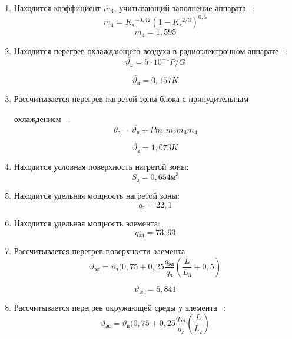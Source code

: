 \begin{enumerate}[label={\arabic*.}]
\item Находится коэффициент $m_4$,
   учитывающий заполнение аппарата ~\cite{Rotkop1976}:
   \begin{equation}
     m_4 = K\mathrm{_{з}}^{-0,42}(1-K\mathrm{_{з}}^{2/3})^{0,5}
   \end{equation}
   $$m_4 = 1,595$$
  
\item Находится перегрев охлаждающего воздуха
  в радиоэлектронном аппарате ~\cite{Rotkop1976}:
  \begin{equation}
    \overline{\vartheta\mathrm{_{в}}} = 5 \cdot 10^{-4} P/G
  \end{equation}
  
  $$\overline{\vartheta\mathrm{_{в}}} = 0,157K$$

\item Рассчитывается перегрев нагретой зоны блока с принудительным

  охлаждением ~\cite{Rotkop1976}:
  \begin{equation}
    \vartheta\mathrm{_{з}} = \overline{\vartheta\mathrm{_{в}}} + P m_1 m_2 m_3 m_4
    \end{equation}
  

    $$\overline{\vartheta\mathrm{_{з}}} = 1,073 K$$

\item Находится условная поверхность нагретой зоны:
  $$S\mathrm{_{з}} = 0,654 \mathrm{м^3}$$

\item Находится удельная мощность нагретой зоны:
  $$q\mathrm{_{з}} = 22,1$$

\item Находится удельная мощность элемента:
  $$q\mathrm{_{эл}} = 73,93$$

\item Рассчитывается перегрев поверхности элемента ~\cite{Rotkop1976}
    \begin{equation}
    \vartheta\mathrm{_{эл}}   =  \vartheta\mathrm{_{з}} (0,75 + 0,25\frac{q\mathrm{_{эл}}}{q\mathrm{_{з}}} (\frac{L}{L_{3}} + 0,5)
    \end{equation}

    $$\vartheta\mathrm{_{эл}} = 5,841$$

\item Рассчитывается перегрев окружающей
  среды у элемента ~\cite{Rotkop1976}:
  \begin{equation}
    \vartheta\mathrm{_{эс}}   =  \vartheta\mathrm{_{в}} (0,75 + 0,25\frac{q\mathrm{_{эл}}}{q\mathrm{_{з}}} (\frac{L}{L_{з}})
    \end{equation}
  

\end{enumerate}
